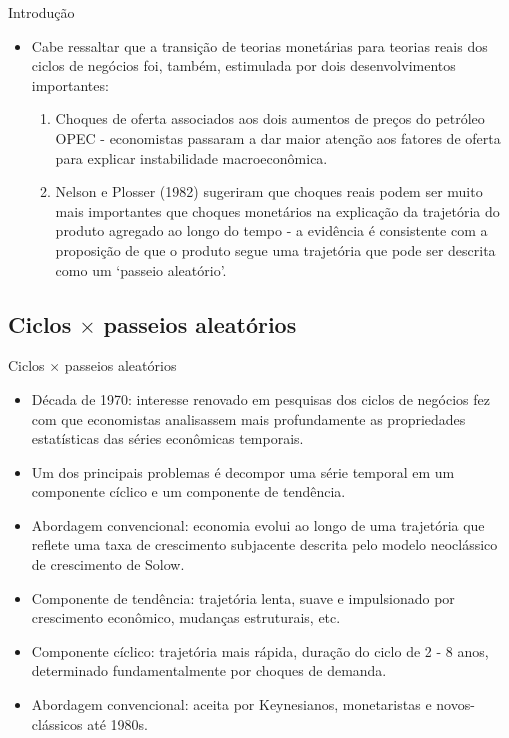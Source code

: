 \documentclass[10pt]{beamer}
\begin{document}
\begin{frame}{Introdução}
    \begin{itemize}
        \item Cabe ressaltar que a transição de teorias monetárias para teorias reais dos ciclos de negócios foi, também, estimulada por dois desenvolvimentos importantes:
        \bigskip
        \begin{enumerate}
            \item Choques de oferta associados aos dois aumentos de preços do petróleo OPEC - economistas passaram a dar maior atenção aos fatores de oferta para explicar instabilidade macroeconômica.
            \bigskip
            \item Nelson e Plosser (1982) sugeriram que choques reais podem ser muito mais importantes que choques monetários na explicação da trajetória do produto agregado ao longo do tempo - a evidência é consistente com a proposição de que o produto segue uma trajetória que pode ser descrita como um `passeio aleatório'.
        \end{enumerate}
    \end{itemize}
\end{frame}

\subsection{Ciclos $\times$ passeios aleatórios}
\begin{frame}{Ciclos $\times$ passeios aleatórios}
    \begin{itemize}
        \item Década de 1970: interesse renovado em pesquisas dos ciclos de negócios fez com que economistas analisassem mais profundamente as propriedades estatísticas das séries econômicas temporais.
        \bigskip
        \item Um dos principais problemas é decompor uma série temporal em um componente cíclico e um componente de tendência.
        \bigskip
        \item Abordagem convencional: economia evolui ao longo de uma trajetória que reflete uma taxa de crescimento subjacente descrita pelo modelo neoclássico de crescimento de Solow.
        \bigskip
        \item Componente de tendência: trajetória lenta, suave e impulsionado por crescimento econômico, mudanças estruturais, etc.
        \bigskip
        \item Componente cíclico: trajetória mais rápida, duração do ciclo de 2 - 8 anos, determinado fundamentalmente por choques de demanda.
        \bigskip
        \item Abordagem convencional: aceita por Keynesianos, monetaristas e novos-clássicos até 1980s.
    \end{itemize}
\end{frame}
\end{document}
